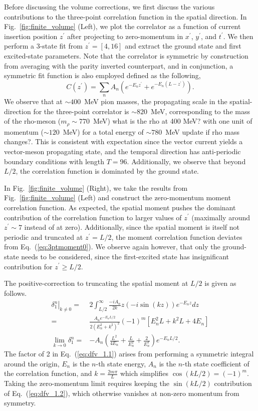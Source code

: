 \documentclass[prd,aps,twocolumn,superscriptaddress,tightenlines,nofootinbib,floatfix,preprintnumbers,10pt]{revtex4-1}
\begin{document}
Before discussing the volume corrections, we first discuss the various contributions to the three-point correlation function in the spatial direction. In Fig.~\ref{fig:finite_volume} (Left), we plot the correlator as a function of current insertion position $z^\prime$ after projecting to zero-momentum in $x^\prime$, $y^\prime$, and $t^\prime$. We then perform a 3-state fit from $z^\prime = [4,16]$ and extract the ground state and first excited-state parameters. Note that the correlator is symmetric by construction from averaging with the parity inverted counterpart, and in conjunction, a symmetric fit function is also employed defined as the following,
\begin{equation}
C(z^\prime) = \sum_n A_n\left(e^{-E_n z^\prime} + e^{-E_n(L-z^\prime)}\right).
\end{equation} We observe that at $\sim 400$~MeV pion masses, the propagating scale in the spatial-direction for the three-point correlator is $\sim 820$~MeV, corresponding to the mass of the rho-meson ($m_\rho \sim 770$~MeV) {\color{red} what is the rho at 400 MeV?} with one unit of momentum ($\sim 120$~MeV) for a total energy of $\sim780$~MeV {\color{red} update if rho mass changes?}. This is consistent with expectation since the vector current yields a vector-meson propagating state, and the temporal direction has anti-periodic boundary conditions with length $T=96$. Additionally, we observe that beyond $L/2$, the correlation function is dominated by the ground state.

In Fig.~\ref{fig:finite_volume} (Right), we take the results from Fig.~\ref{fig:finite_volume} (Left) and construct the zero-momentum moment correlation function. As expected, the spatial moment pushes the dominant contribution of the correlation function to larger values of $z^\prime$ (maximally around $z^\prime \sim 7$ instead of at zero). Additionally, since the spatial moment is itself not periodic and truncated at $z^\prime = L/2$, the moment correlation function deviates from Eq.~(\ref{eq:3ptmoment0}). We observe again however, that only the ground-state needs to be considered, since the first-excited state has insignificant contribution for $z^\prime \geq L/2$.

The positive-correction to truncating the spatial moment at $L/2$ is given as follows.
\begin{align}
\left.\delta^n_{1}\right|_{k\neq 0}= & 2\int_{L/2}^{\infty} \frac{-iA_n}{2k} z(-i \sin(kz))e^{-E_n z} dz \label{eq:dfv_1.1}\\
=& \frac{A_n e^{-E_n L/2}}{2(E_n^2+k^2)^2}(-1)^m\left[E_n^2L+k^2L+4E_n\right] \label{eq:dfv_1.2}\\
\lim_{k\rightarrow 0}\delta^n_{1} =& -A_n\left(\frac{L^2}{4E_n}+\frac{L}{E_n^2}+\frac{2}{E_n^3}\right)e^{-E_n L/2}. \label{eq:dfv_1.0}
\end{align}
The factor of 2 in Eq.~(\ref{eq:dfv_1.1}) arises from performing a symmetric integral around the origin, $E_n$ is the $n$-th state energy, $A_n$ is the $n$-th state coefficient of the correlation function, and $k=\frac{2m\pi}{L}$ which simplifies $\cos(kL/2) = (-1)^m$. Taking the zero-momentum limit requires keeping the $\sin({kL/2})$ contribution of Eq.~(\ref{eq:dfv_1.2}), which otherwise vanishes at non-zero momentum from symmetry.
\end{document}
